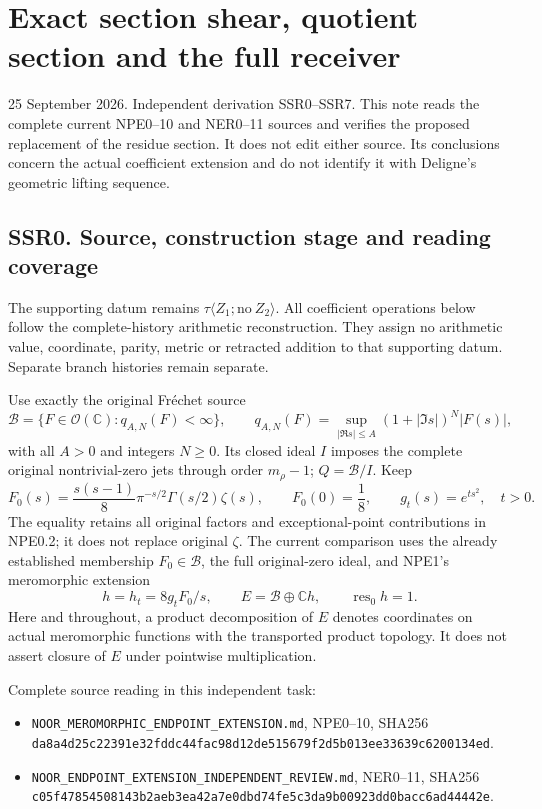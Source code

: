 \section{Exact section shear, quotient section and the full
receiver}\label{exact-section-shear-quotient-section-and-the-full-receiver}

25 September 2026. Independent derivation SSR0--SSR7. This note reads
the complete current NPE0--10 and NER0--11 sources and verifies the
proposed replacement of the residue section. It does not edit either
source. Its conclusions concern the actual coefficient extension and do
not identify it with Deligne's geometric lifting sequence.

\subsection{SSR0. Source, construction stage and reading
coverage}\label{ssr0.-source-construction-stage-and-reading-coverage}

The supporting datum remains
\(\tau\langle Z_1;\mathrm{no}\ Z_2\rangle\). All coefficient operations
below follow the complete-history arithmetic reconstruction. They assign
no arithmetic value, coordinate, parity, metric or retracted addition to
that supporting datum. Separate branch histories remain separate.

Use exactly the original Fréchet source \[
\mathcal B=\{F\in\mathcal O(\mathbb C):q_{A,N}(F)<\infty\},\qquad
q_{A,N}(F)=\sup_{|\Re s|\le A}(1+|\Im s|)^N|F(s)|,
\tag{SSR0.1}
\] with all \(A>0\) and integers \(N\ge0\). Its closed ideal \(I\)
imposes the complete original nontrivial-zero jets through order
\(m_\rho-1\); \(Q=\mathcal B/I\). Keep \[
F_0(s)=\frac{s(s-1)}8\pi^{-s/2}\Gamma(s/2)\zeta(s),\qquad
F_0(0)=\frac18,\qquad g_t(s)=e^{ts^2},\quad t>0.
\tag{SSR0.2}
\] The equality retains all original factors and exceptional-point
contributions in NPE0.2; it does not replace original \(\zeta\). The
current comparison uses the already established membership
\(F_0\in\mathcal B\), the full original-zero ideal, and NPE1's
meromorphic extension \[
h=h_t=8g_tF_0/s,\qquad E=\mathcal B\oplus\mathbb C h,
\qquad\operatorname{res}_0h=1.
\tag{SSR0.3}
\] Here and throughout, a product decomposition of \(E\) denotes
coordinates on actual meromorphic functions with the transported product
topology. It does not assert closure of \(E\) under pointwise
multiplication.

Complete source reading in this independent task:

\begin{itemize}
\tightlist
\item
  \nolinkurl{NOOR_MEROMORPHIC_ENDPOINT_EXTENSION.md}, NPE0--10, SHA256
  \nolinkurl{da8a4d25c22391e32fddc44fac98d12de515679f2d5b013ee33639c6200134ed}.
\item
  \nolinkurl{NOOR_ENDPOINT_EXTENSION_INDEPENDENT_REVIEW.md}, NER0--11,
  SHA256
  \nolinkurl{c05f47854508143b2aeb3ea42a7e0dbd74fe5c3da9b00923dd0bacc6ad44442e}.
\end{itemize}

